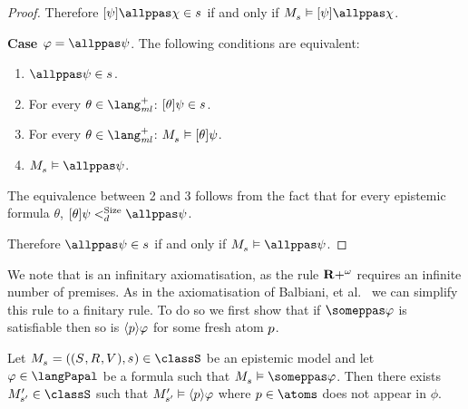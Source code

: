 \begin{proof}
Therefore $\announceA{\psi} \allppas \chi \in \kStateS$ if and only if $\kPModel{\kStateS} \entails \announceA{\psi} \allppas \chi$.

{\bf Case $\phi = \allppas \psi$}.
The following conditions are equivalent:
\begin{enumerate}
    \item $\allppas \psi \in \kStateS$.
    \item For every $\theta \in \langMlPlus$: $\announceA{\theta} \psi \in \kStateS$.
    \item For every $\theta \in \langMlPlus$: $\kPModel{\kStateS} \entails \announceA{\theta} \psi$.
    \item $\kPModel{\kStateS} \entails \allppas \psi$.
\end{enumerate}
The equivalence between 2 and 3 follows from the fact that for every epistemic formula $\theta$, $\announceA{\theta} \psi <^\text{Size}_d \allppas \psi$.

Therefore $\allppas \psi \in \kStateS$ if and only if $\kPModel{\kStateS} \entails \allppas \psi$.
\end{proof}

We note that \axiomPapalS{} is an infinitary axiomatisation, as the rule ${\bf R+^\omega}$ requires an infinite number of premises.
As in the axiomatisation of Balbiani, et al.~\cite{balbiani:2008} we can simplify this rule to a finitary rule.
To do so we first show that if $\someppas \phi$ is satisfiable then so is $\langle p \rangle \varphi$ for some fresh atom $p$. 

\begin{lemma}\label{diamond-lemma}
Let $\kPModelAndTuple{\kStateS} \in \classS$ be an epistemic model and
let $\phi \in \langPapal$ be a formula such that $\kPModel{\kStateS} \entails \someppas \phi$.
Then there exists $\kPModelP{\kStateSP} \in \classS$ such that ${M^{\prime}_{{s}^{\prime}}} \vDash \langle p \rangle \varphi$ where $\atomP \in \atoms$ does not appear in $\phi$.
\end{lemma}

